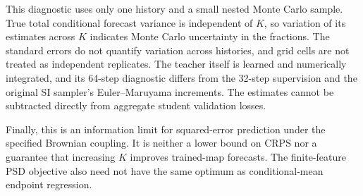 This diagnostic uses only one history and a small nested Monte Carlo sample. True total conditional forecast variance is independent of $K$, so variation of its estimates across $K$ indicates Monte Carlo uncertainty in the fractions. The standard errors do not quantify variation across histories, and grid cells are not treated as independent replicates. The teacher itself is learned and numerically integrated, and its 64-step diagnostic differs from the 32-step supervision and the original SI sampler's Euler--Maruyama increments. The estimates cannot be subtracted directly from aggregate student validation losses.

Finally, this is an information limit for squared-error prediction under the specified Brownian coupling. It is neither a lower bound on CRPS nor a guarantee that increasing $K$ improves trained-map forecasts. The finite-feature PSD objective also need not have the same optimum as conditional-mean endpoint regression. 
